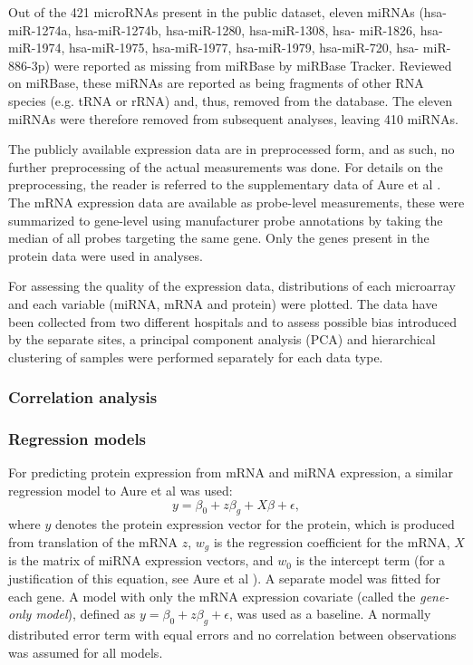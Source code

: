 Out of the 421 microRNAs present in the public dataset, eleven miRNAs (hsa-
miR-1274a, hsa-miR-1274b, hsa-miR-1280, hsa-miR-1308, hsa- miR-1826, hsa-
miR-1974, hsa-miR-1975, hsa-miR-1977, hsa-miR-1979, hsa-miR-720, hsa-
miR-886-3p) were reported as missing from miRBase by miRBase Tracker. Reviewed
on miRBase, these miRNAs are reported as being fragments of other RNA species
(e.g. tRNA or rRNA) and, thus, removed from the database. The eleven miRNAs
were therefore removed from subsequent analyses, leaving 410 miRNAs.

The publicly available expression data are in preprocessed form, and as such,
no further preprocessing of the actual measurements was done. For details on
the preprocessing, the reader is referred to the supplementary data of Aure et
al \citep{Aure2015}. The mRNA expression data are available as probe-level
measurements, these were summarized to gene-level using manufacturer probe
annotations by taking the median of all probes targeting the same gene.
Only the genes present in the protein data were used in analyses.

For assessing the quality of the expression data, distributions of each
microarray and each variable (miRNA, mRNA and protein) were plotted. The data
have been collected from two different hospitals and to assess possible bias
introduced by the separate sites, a principal component analysis (PCA) and
hierarchical clustering of samples were performed separately for each data
type.



\subsubsection{Correlation analysis}


\subsubsection{Regression models}

For predicting protein expression from mRNA and miRNA expression, a similar
regression model to Aure et al was used:
\begin{equation}
	\label{eq:reg-model}
	y = \beta_0 + z \beta_g + X \beta + \epsilon,
\end{equation}
where $y$ denotes the protein expression vector for the protein, which
is produced from translation of the mRNA $z$, $w_g$
is the regression coefficient for the mRNA, $X$ is the matrix of miRNA
expression vectors, and $w_0$ is the intercept term
(for a justification of this equation, see Aure et al \citep{Aure2015}).
A separate model was fitted for each gene.
A model with only the mRNA expression covariate (called the \emph{gene-only model}),
defined as $y = \beta_0 + z \beta_g + \epsilon$, was used as a baseline.
A normally distributed error term with equal errors and no correlation
between observations was assumed for all models.

